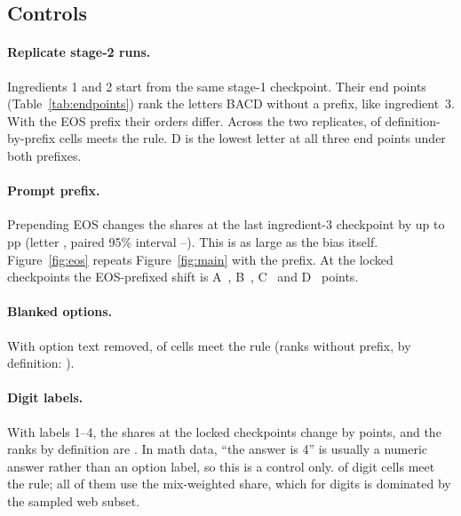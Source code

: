 \documentclass[11pt,a4paper]{article}
\newcommand{\pp}{\,pp}
\begin{document}
\subsection{Controls}
\paragraph{Replicate stage-2 runs.} Ingredients 1 and 2 start from the same stage-1 checkpoint. Their end points (Table~\ref{tab:endpoints}) rank the letters BACD without a prefix, like ingredient~3. With the EOS prefix their orders differ. Across the two replicates, \RepMatched{} of \RepCells{} definition-by-prefix cells meets the rule. D is the lowest letter at all three end points under both prefixes.

\begin{table}[t]
\centering\small

\caption{Letter shares at the end points of the three stage-2 runs (shuffled condition).}\label{tab:endpoints}
\end{table}

\paragraph{Prompt prefix.} Prepending EOS changes the shares at the last ingredient-3 checkpoint by up to \EosEffectMax\pp{} (letter \EosEffectLabel, paired 95\% interval \EosEffectLo--\EosEffectHi). This is as large as the bias itself. Figure~\ref{fig:eos} repeats Figure~\ref{fig:main} with the prefix. At the locked checkpoints the EOS-prefixed shift is A~\ShiftEosA, B~\ShiftEosB, C~\ShiftEosC{} and D~\ShiftEosD{} points.

\paragraph{Blanked options.} With option text removed, \BlankMatched{} of \BlankCells{} cells meet the rule (ranks without prefix, by definition: \BlankRanks).

\paragraph{Digit labels.} With labels 1--4, the shares at the locked checkpoints change by \DigitShift{} points, and the ranks by definition are \DigitRanks. In math data, ``the answer is 4'' is usually a numeric answer rather than an option label, so this is a control only. \DigitMatched{} of \DigitCells{} digit cells meet the rule; all of them use the mix-weighted share, which for digits is dominated by the sampled web subset.
\end{document}
